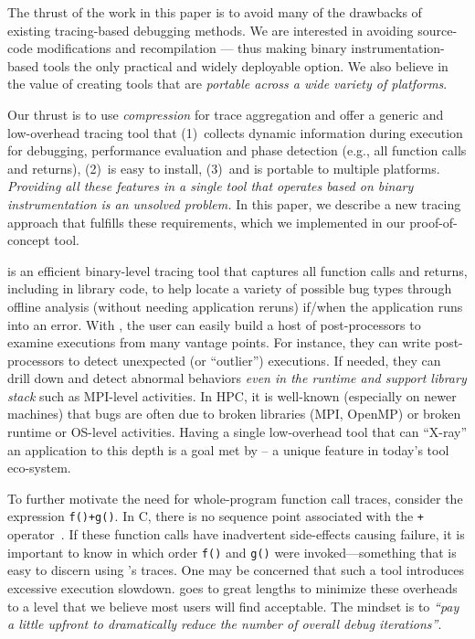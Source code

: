 The thrust of the work in this paper is to avoid many of the drawbacks of existing
tracing-based debugging methods.
%
We are interested in avoiding
source-code modifications and recompilation --- thus making binary
instrumentation-based tools the only practical and widely deployable option.
%
We also believe in the value
of creating tools that are {\em portable across a 
wide variety of platforms}.
%

%
Our thrust is to use \textit{compression} for trace aggregation and offer 
a generic and low-overhead tracing tool that 
(1)~collects dynamic information during execution for debugging, performance evaluation and phase detection (e.g., all function
calls and returns), 
(2)~is easy to install, 
(3)~and is portable to multiple platforms.
%
{\em Providing all these features in a single tool
that operates based on binary instrumentation
is an unsolved problem.}
%
In this paper, we describe a new tracing approach that fulfills these requirements, which we implemented in our proof-of-concept \parlot tool.


\parlot is an efficient binary-level tracing tool that captures all function calls and returns, including in library code, 
to help locate a variety of possible bug types through 
offline analysis (without needing application reruns) 
if/when the application runs into an error. 
%
With \parlot, the user can easily build a host of post-processors to examine
executions from many vantage points.
%
For instance, they can write post-processors
to detect unexpected (or ``outlier'') executions.
%
If needed, they can 
drill down and detect abnormal behaviors {\em even in the runtime and
support library stack} such as MPI-level activities.
%
In HPC, it is well-known (especially on newer machines) that bugs are often due to
broken libraries (MPI, OpenMP) or broken runtime or OS-level activities.
%
Having a single low-overhead tool that can ``X-ray'' an application to this depth is a goal met by \parlot -- a unique feature in today's tool eco-system.

To further motivate the need for whole-program function call
traces, consider the expression {\tt f()+g()}.
%
In C, there is no sequence point associated with the {\tt +}
operator~\cite{sequence-points-in-C}.
%
If these function calls have inadvertent side-effects causing 
failure, it is important to know in which order {\tt f()}
and {\tt g()} were invoked---something that is easy to discern using
\parlot 's traces.
%
One may be concerned that such a tool introduces excessive execution slowdown.
%
\parlot goes to great lengths to minimize these overheads to a level that we believe most users will find acceptable. The mindset is to \textit{``pay a little upfront to dramatically reduce the number of overall debug iterations''}. 

